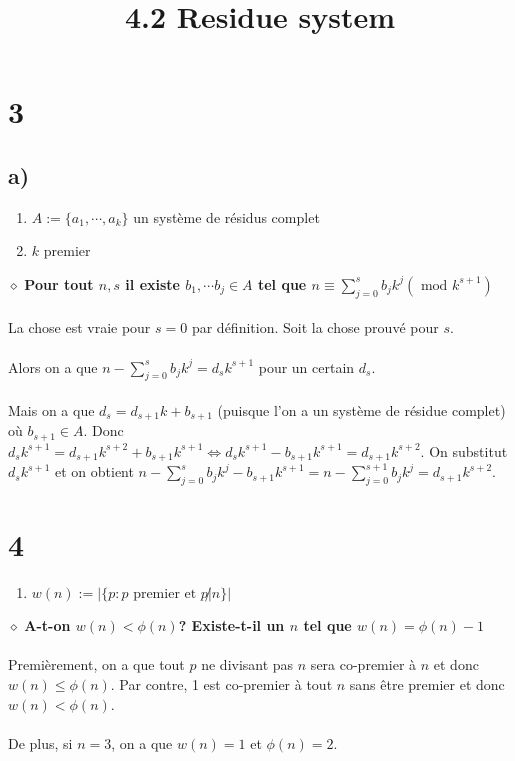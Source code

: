 \documentclass[a4paper,10pt]{article}
\title{4.2 Residue system}
\begin{document}
\maketitle

\section*{3}
\subsection*{a)}
\begin{enumerate}
	\item $A := \{a_1, \cdots, a_k\}$ un système de résidus complet
	\item $k$ premier
\end{enumerate}
$\diamond$ \textbf{Pour tout $n,s$ il existe $b_1, \cdots b_j \in A$ tel que $n \equiv \displaystyle\sum_{j=0}^s b_j k^j (\text{ mod }k^{s+1})$}
\\
\\
La chose est vraie pour $s = 0$ par définition. Soit la chose prouvé pour $s$. 
\\
\\
Alors on a que $n - \displaystyle\sum_{j=0}^s b_j k^j = d_s k^{s+1}$ pour un certain $d_s$.
\\
\\
Mais on a que $d_s = d_{s+1}k + b_{s+1}$ (puisque l'on a un système de résidue complet) où $b_{s+1} \in A$. Donc $d_s k^{s+1} = d_{s+1}k^{s+2} + b_{s+1}k^{s+1} \Leftrightarrow d_{s}k^{s+1} - b_{s+1}k^{s+1} = d_{s+1}k^{s+2}$. On substitut $d_{s}k^{s+1}$ et on obtient $n - \displaystyle\sum_{j=0}^s b_j k^j - b_{s+1}k^{s+1} = n - \displaystyle\sum_{j=0}^{s+1} b_j k^j = d_{s+1}k^{s+2}$.

\section*{4}
\begin{enumerate}
	\item $w(n) := |\{p : p \text{ premier et } p \not | n\}|$
\end{enumerate}
$\diamond$ \textbf{A-t-on $w(n) < \phi(n)$? Existe-t-il un $n$ tel que $w(n) = \phi(n)-1$}
\\
\\
Premièrement, on a que tout $p$ ne divisant pas $n$ sera co-premier à $n$ et donc $w(n) \leq \phi(n)$. Par contre, 1 est co-premier à tout $n$ sans être premier et donc $w(n) < \phi(n)$.
\\
\\
De plus, si $n=3$, on a que $w(n) = 1$ et $\phi(n) = 2$.
\end{document}

